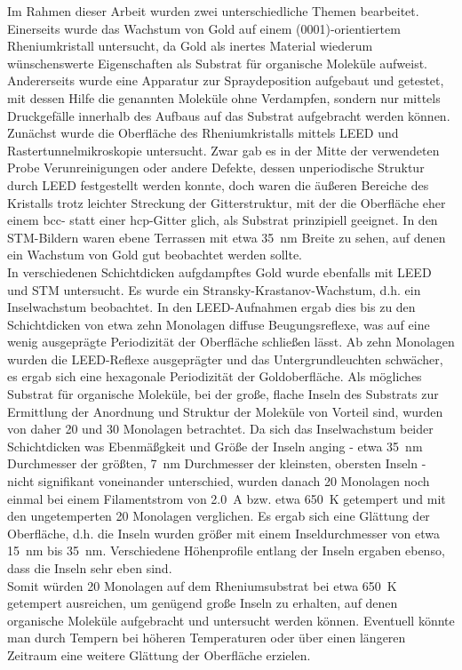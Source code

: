 Im Rahmen dieser Arbeit wurden zwei unterschiedliche Themen bearbeitet. Einerseits wurde das
Wachstum von Gold auf einem (0001)-orientiertem Rheniumkristall untersucht, da Gold als
inertes Material wiederum wünschenswerte Eigenschaften als Substrat für organische Moleküle
aufweist. Andererseits wurde eine Apparatur zur Spraydeposition aufgebaut und getestet, mit
dessen Hilfe die genannten Moleküle ohne Verdampfen, sondern nur mittels Druckgefälle innerhalb
des Aufbaus auf das Substrat aufgebracht werden können.
\\
Zunächst wurde die Oberfläche des Rheniumkristalls mittels LEED und Rastertunnelmikroskopie
untersucht. Zwar gab es in der Mitte der verwendeten Probe Verunreinigungen oder andere Defekte,
dessen unperiodische Struktur durch LEED festgestellt werden konnte, doch waren die äußeren Bereiche
des Kristalls trotz leichter Streckung der Gitterstruktur, mit der die Oberfläche eher einem bcc-
statt einer hcp-Gitter glich, als Substrat prinzipiell geeignet. In den STM-Bildern waren ebene
Terrassen mit etwa \SI{35}{nm} Breite zu sehen, auf denen ein Wachstum von Gold gut
beobachtet werden sollte.
\\
In verschiedenen Schichtdicken aufgdampftes Gold wurde ebenfalls mit LEED und STM untersucht. Es
wurde ein Stransky-Krastanov-Wachstum, d.h. ein Inselwachstum beobachtet. In den LEED-Aufnahmen
ergab dies bis zu den Schichtdicken von etwa zehn Monolagen diffuse Beugungsreflexe, was auf eine
wenig ausgeprägte Periodizität der Oberfläche schließen lässt. Ab zehn Monolagen wurden die
LEED-Reflexe ausgeprägter und das Untergrundleuchten schwächer, es ergab sich eine hexagonale
Periodizität der Goldoberfläche. Als mögliches Substrat für organische Moleküle, bei der große,
flache Inseln des Substrats zur Ermittlung der Anordnung und Struktur der Moleküle von Vorteil sind,
wurden von daher 20 und 30 Monolagen betrachtet. Da sich das Inselwachstum beider Schichtdicken was Ebenmäßgkeit und Größe
der Inseln anging - etwa \SI{35}{nm} Durchmesser der größten, 
\SI{7}{nm} Durchmesser der kleinsten, obersten Inseln - nicht signifikant voneinander
unterschied, wurden danach 20 Monolagen noch einmal bei einem Filamentstrom von
\SI{2,0}{A} bzw. etwa \SI{650}{K} getempert und mit den ungetemperten 20 Monolagen verglichen. Es
ergab sich eine Glättung der Oberfläche, d.h. die Inseln wurden größer mit einem Inseldurchmesser
von etwa \SI{15}{nm} bis \SI{35}{nm}. Verschiedene Höhenprofile entlang der Inseln ergaben ebenso,
dass die Inseln sehr eben sind.
\\
Somit würden 20 Monolagen auf dem Rheniumsubstrat bei etwa \SI{650}{K} getempert ausreichen, um
genügend große Inseln zu erhalten, auf denen organische Moleküle aufgebracht und untersucht werden
können. Eventuell könnte man durch Tempern bei höheren Temperaturen oder über einen längeren
Zeitraum eine weitere Glättung der Oberfläche erzielen.
\\

